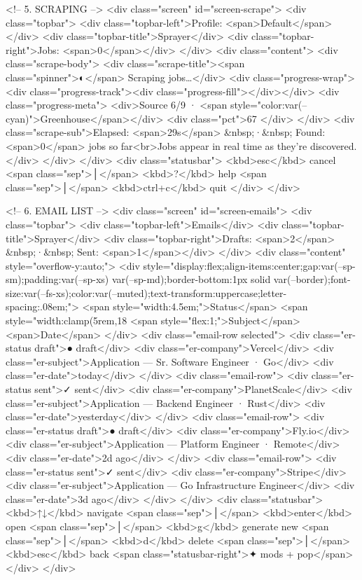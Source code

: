 {{{{{{{{{{{{{{<!-- 5. SCRAPING -->
<div class="screen" id="screen-scrape">
  <div class="topbar">
    <div class="topbar-left">Profile: <span>Default</span></div>
    <div class="topbar-title">Sprayer</div>
    <div class="topbar-right">Jobs: <span>0</span></div>
  </div>
  <div class="content">
    <div class="scrape-body">
      <div class="scrape-title"><span class="spinner">◐</span> Scraping jobs…</div>
      <div class="progress-wrap">
        <div class="progress-track"><div class="progress-fill"></div></div>
        <div class="progress-meta">
          <div>Source 6/9 · <span style="color:var(--cyan)">Greenhouse</span></div>
          <div class="pct">67%
        </div>
      </div>
      <div class="scrape-sub">Elapsed: <span>29s</span> &nbsp;·&nbsp; Found: <span>0</span> jobs so far<br>Jobs appear in real time as they're discovered.</div>
    </div>
  </div>
  <div class="statusbar">
    <kbd>esc</kbd> cancel <span class="sep">│</span> <kbd>?</kbd> help <span class="sep">│</span> <kbd>ctrl+c</kbd> quit
  </div>
</div>

<!-- 6. EMAIL LIST -->
<div class="screen" id="screen-emails">
  <div class="topbar">
    <div class="topbar-left">Emails</div>
    <div class="topbar-title">Sprayer</div>
    <div class="topbar-right">Drafts: <span>2</span> &nbsp;·&nbsp; Sent: <span>1</span></div>
  </div>
  <div class="content" style="overflow-y:auto;">
    <div style="display:flex;align-items:center;gap:var(--sp-sm);padding:var(--sp-xs) var(--sp-md);border-bottom:1px solid var(--border);font-size:var(--fs-xs);color:var(--muted);text-transform:uppercase;letter-spacing:.08em;">
      <span style="width:4.5em;">Status</span>
      <span style="width:clamp(5rem,18%
      <span style="flex:1;">Subject</span>
      <span>Date</span>
    </div>
    <div class="email-row selected">
      <div class="er-status draft">● draft</div>
      <div class="er-company">Vercel</div>
      <div class="er-subject">Application — Sr. Software Engineer · Go</div>
      <div class="er-date">today</div>
    </div>
    <div class="email-row">
      <div class="er-status sent">✓ sent</div>
      <div class="er-company">PlanetScale</div>
      <div class="er-subject">Application — Backend Engineer · Rust</div>
      <div class="er-date">yesterday</div>
    </div>
    <div class="email-row">
      <div class="er-status draft">● draft</div>
      <div class="er-company">Fly.io</div>
      <div class="er-subject">Application — Platform Engineer · Remote</div>
      <div class="er-date">2d ago</div>
    </div>
    <div class="email-row">
      <div class="er-status sent">✓ sent</div>
      <div class="er-company">Stripe</div>
      <div class="er-subject">Application — Go Infrastructure Engineer</div>
      <div class="er-date">3d ago</div>
    </div>
  </div>
  <div class="statusbar">
    <kbd>↑↓</kbd> navigate <span class="sep">│</span>
    <kbd>enter</kbd> open <span class="sep">│</span>
    <kbd>g</kbd> generate new <span class="sep">│</span>
    <kbd>d</kbd> delete <span class="sep">│</span>
    <kbd>esc</kbd> back
    <span class="statusbar-right">✦ mods + pop</span>
  </div>
</div>

}}}}}}}}}}}}}}
